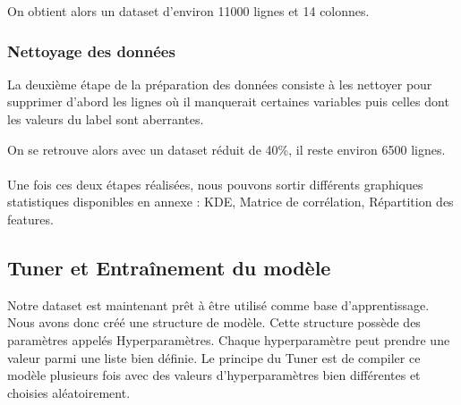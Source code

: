 On obtient alors un dataset d'environ 11000 lignes et 14 colonnes.

\subsubsection{Nettoyage des données}

La deuxième étape de la préparation des données consiste à les nettoyer pour supprimer d'abord les lignes où il manquerait certaines variables puis celles dont les valeurs du label sont aberrantes.

On se retrouve alors avec un dataset réduit de 40\%, il reste environ 6500 lignes.

\paragraph{}


Une fois ces deux étapes réalisées, nous pouvons sortir différents graphiques statistiques disponibles en annexe : KDE, Matrice de corrélation, Répartition des features.


\subsection{Tuner et Entraînement du modèle}

Notre dataset est maintenant prêt à être utilisé comme base d'apprentissage. Nous avons donc créé une structure de modèle. Cette structure possède des paramètres appelés Hyperparamètres. Chaque hyperparamètre peut prendre une valeur parmi une liste bien définie. Le principe du Tuner est de compiler ce modèle plusieurs fois avec des valeurs d'hyperparamètres bien différentes et choisies aléatoirement.

